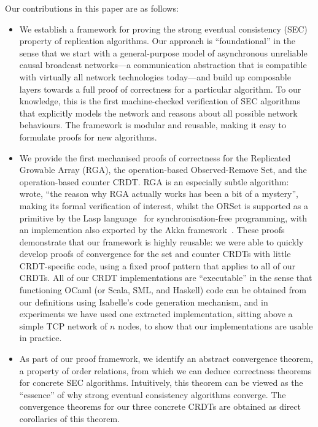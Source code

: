 \documentclass[acmsmall,screen]{acmart}
\begin{document}
Our contributions in this paper are as follows:
\begin{itemize}
\item
We establish a framework for proving the strong eventual consistency (SEC) property of replication algorithms.
Our approach is ``foundational'' in the sense that we start with a general-purpose model of asynchronous unreliable causal broadcast networks---a communication abstraction that is compatible with virtually all network technologies today---and build up composable layers towards a full proof of correctness for a particular algorithm.
To our knowledge, this is the first machine-checked verification of SEC algorithms that explicitly models the network and reasons about all possible network behaviours.
The framework is modular and reusable, making it easy to formulate proofs for new algorithms.
\item
We provide the first mechanised proofs of correctness for the Replicated Growable Array (RGA), the operation-based Observed-Remove Set, and the operation-based counter CRDT.
RGA is an especially subtle algorithm: \citet{Attiya:2016kh} wrote, ``the reason why RGA actually works has been a bit of a mystery'', making its formal verification of interest, whilst the ORSet is supported as a primitive by the Lasp language~\cite{DBLP:conf/ppdp/MeiklejohnR15} for synchronisation-free programming, with an implemention also exported by the Akka framework~\cite{akka}.
These proofs demonstrate that our framework is highly reusable: we were able to quickly develop proofs of convergence for the set and counter CRDTs with little CRDT-specific code, using a fixed proof pattern that applies to all of our CRDTs.
All of our CRDT implementations are ``executable'' in the sense that functioning OCaml (or Scala, SML, and Haskell) code can be obtained from our definitions using Isabelle's code generation mechanism, and in experiments we have used one extracted implementation, sitting above a simple TCP network of $n$ nodes, to show that our implementations are usable in practice.
\item
As part of our proof framework, we identify an abstract convergence theorem, a property of order relations, from which we can deduce correctness theorems for concrete SEC algorithms.
Intuitively, this theorem can be viewed as the ``essence'' of why strong eventual consistency algorithms converge.
The convergence theorems for our three concrete CRDTs are obtained as direct corollaries of this theorem.
\end{itemize}
\end{document}
